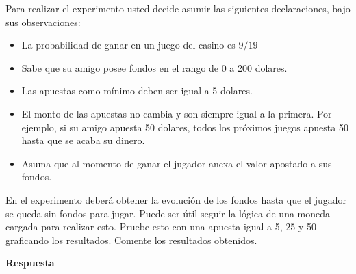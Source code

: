 \documentclass[]{article}
\providecommand{\tightlist}{%
  \setlength{\itemsep}{0pt}\setlength{\parskip}{0pt}}
\begin{document}
Para realizar el experimento usted decide asumir las siguientes
declaraciones, bajo sus observaciones:

\begin{itemize}
\tightlist
\item
  La probabilidad de ganar en un juego del casino es \(9/19\)
\item
  Sabe que su amigo posee fondos en el rango de 0 a 200 dolares.
\item
  Las apuestas como mínimo deben ser igual a 5 dolares.
\item
  El monto de las apuestas no cambia y son siempre igual a la primera.
  Por ejemplo, si su amigo apuesta 50 dolares, todos los próximos juegos
  apuesta 50 hasta que se acaba su dinero.
\item
  Asuma que al momento de ganar el jugador anexa el valor apostado a sus
  fondos.
\end{itemize}

En el experimento deberá obtener la evolución de los fondos hasta que el
jugador se queda sin fondos para jugar. Puede ser útil seguir la lógica
de una moneda cargada para realizar esto. Pruebe esto con una apuesta
igual a 5, 25 y 50 graficando los resultados. Comente los resultados
obtenidos.

\textbf{Respuesta}
\end{document}
